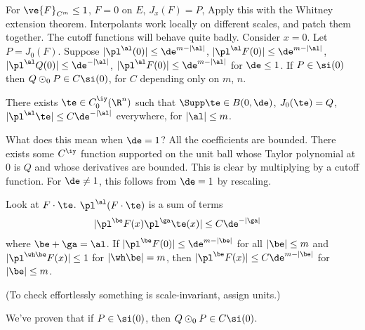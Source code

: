 For $\ve{F}_{C^m}\le 1$, $F=0$ on $E$, $J_x(F)=P$, %
Apply this with the Whitney extension theorem. Interpolants work locally on different scales, and patch them together. The cutoff functions will behave quite badly. 
Consider $x=0$. 
Let $P=J_0(F)$. Suppose $|\pl^\al(0)|\le \de^{m-|\al|}$, $|\pl^\al F(0)|\le \de^{m-|\al|}$, $|\pl^\al Q(0)|\le \de^{-|\al|}$, $|\pl^\al F(0)|\le \de^{m-|\al|}$ for $\de\le 1$. If $P\in \si(0)$ then $Q\odot_0 P \in C\si(0)$, for $C$ depending only on $m$, $n$. 

There exists $\te\in C_0^\iy(\R^n)$ such that $\Supp\te\in B(0,\de)$, $J_0(\te)=Q$, $|\pl^\al \te|\le C\de^{-|\al|}$ everywhere, for $|\al|\le m$. 

What does this mean when $\de=1$? All the coefficients are bounded. There exists some $C^\iy$ function supported on the unit ball whose Taylor polynomial at 0 is $Q$ and whose derivatives are bounded. This is clear by multiplying by a cutoff function. For $\de\ne 1$, this follows from $\de=1$ by rescaling. 

Look at $F\cdot \te$. $\pl^\al(F\cdot \te)$ is a sum of terms
\begin{align}
|\pl^\be F(x) \pl^\ga \te(x) |
&\le C\de^{-|\ga|}
\end{align}
where $\be+\ga=\al$. %
If $|\pl^\be F(0)|\le \de^{m-|\be|}$ for all $|\be|\le m$ and $|\pl^{\wh\be} F(x)|\le 1$  for $|\wh \be |=m$, then $|\pl^\be F(x)|\le C\de^{m-|\be|}$ for $|\be|\le m$. 

(To  check effortlessly something is scale-invariant, assign units.)

We've proven that if $P\in \si(0)$, then $Q\odot_0P \in C\si(0)$.


